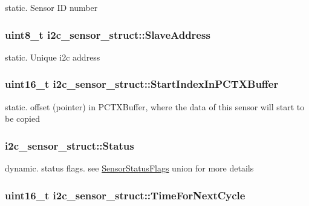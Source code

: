 static. Sensor I\-D number \hypertarget{structi2c__sensor__struct_a0a20808ade927f5f6b35ae30035c6497}{
\subsubsection[{Slave\-Address}]{\setlength{\rightskip}{0pt plus 5cm}uint8\-\_\-t i2c\-\_\-sensor\-\_\-struct\-::\-Slave\-Address}}\label{structi2c__sensor__struct_a0a20808ade927f5f6b35ae30035c6497}
static. Unique i2c address \hypertarget{structi2c__sensor__struct_aba69a0c931d1639b77e1c3f2b7ce7345}{
\subsubsection[{Start\-Index\-In\-P\-C\-T\-X\-Buffer}]{\setlength{\rightskip}{0pt plus 5cm}uint16\-\_\-t i2c\-\_\-sensor\-\_\-struct\-::\-Start\-Index\-In\-P\-C\-T\-X\-Buffer}}\label{structi2c__sensor__struct_aba69a0c931d1639b77e1c3f2b7ce7345}
static. offset (pointer) in P\-C\-T\-X\-Buffer, where the data of this sensor will start to be copied \hypertarget{structi2c__sensor__struct_ae97c7a24c8a108b3b07e7757b486c802}{
\subsubsection[{Status}]{ i2c\-\_\-sensor\-\_\-struct\-::\-Status}}\label{structi2c__sensor__struct_ae97c7a24c8a108b3b07e7757b486c802}
dynamic. status flags. see \hyperlink{union_sensor_status_flags}{Sensor\-Status\-Flags} union for more details \hypertarget{structi2c__sensor__struct_ad76684862532a553add650a6a7d82165}{
\subsubsection[{Time\-For\-Next\-Cycle}]{\setlength{\rightskip}{0pt plus 5cm}uint16\-\_\-t i2c\-\_\-sensor\-\_\-struct\-::\-Time\-For\-Next\-Cycle}}\label{structi2c__sensor__struct_ad76684862532a553add650a6a7d82165}
